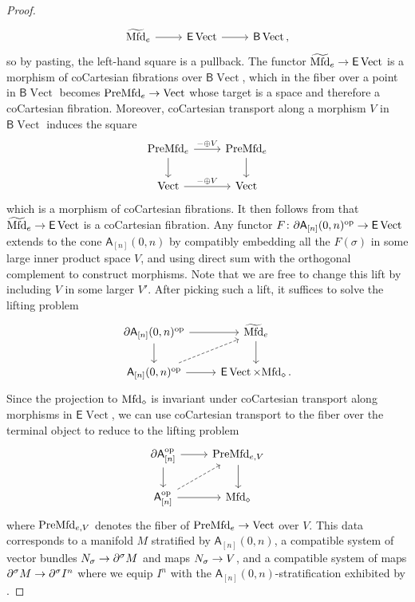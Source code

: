 \documentclass[10pt]{amsart}
\numberwithin{equation}{section}
\theoremstyle{definition}
\DeclareMathOperator{\op}{op}
\DeclareMathOperator{\Vect}{Vect}
\newcommand{\Mfd}{\mathrm{Mfd}\vphantom{d}}
\newcommand{\PreMfd}{\mathrm{PreMfd}\vphantom{d}}
\newcommand{\sfA}{\mathsf{A}}
\newcommand{\sfB}{\mathsf{B}}
\newcommand{\sfE}{\mathsf{E}}
\newcommand{\del}{\partial}
\renewcommand{\to}{\mathchoice{\longrightarrow}{\rightarrow}{}{}}
\begin{document}
\begin{proof}
\begin{equation*}
\begin{tikzcd}
			\widetilde{\Mfd}_{e}  \arrow[r]               &   \sfE\Vect  \arrow[r]            &  \sfB \Vect \, ,
		\end{tikzcd}
	\end{equation*}
	so by pasting, the left-hand square is a pullback.
  The functor $\widetilde{\Mfd}_{e}\to \sfE \Vect$ is a morphism of coCartesian fibrations over $\sfB \Vect$, which in the fiber over a point in $\sfB\Vect$ becomes $\PreMfd_{e}\to \Vect$ whose target is a space and therefore a coCartesian fibration.
  Moreover, coCartesian transport along a morphism $V$ in $\sfB\Vect$ induces the square
	\begin{equation*}
		\begin{tikzcd}
			\PreMfd_{e} \arrow[r, "-\oplus V"] \arrow[d]      &   \PreMfd_{e}  \arrow[d] \\
			\Vect  \arrow[r, "-\oplus V"]               &   \Vect
		\end{tikzcd}
	\end{equation*}
	which is a morphism of coCartesian fibrations.
  It then follows from  that $\widetilde{\Mfd}_{e}\to \sfE\Vect$ is a coCartesian fibration.
  Any functor $F\colon \del \sfA_{[n]}(0,n)^{\op} \to \sfE \Vect$ extends to the cone $\sfA_{[n]}(0,n)$ by compatibly embedding all the $F(\sigma)$ in some large inner product space $V$, and using direct sum with the orthogonal complement to construct morphisms.
  Note that we are free to change this lift by including $V$ in some larger $V'$.
  After picking such a lift, it suffices to solve the lifting problem
	\begin{equation*}
		\begin{tikzcd}
			\del \sfA_{[n]}(0,n)^{\op} \arrow[r] \arrow[d]      &   \widetilde{\Mfd}_{e} \arrow[d] \\
			\sfA_{[n]}(0,n)^{\op}  \arrow[r]  \arrow[ur,dashed]              &   \sfE \Vect \times \Mfd_{\diamond} \,.
		\end{tikzcd}
	\end{equation*}
	Since the projection to $\Mfd_{\diamond}$ is invariant under coCartesian transport along morphisms in $\sfE \Vect$, we can use coCartesian transport to the fiber over the terminal object to reduce to the lifting problem
	\begin{equation*}
		\begin{tikzcd}
			\del \sfA_{[n]}^{\op} \arrow[r] \arrow[d]      &   \PreMfd_{e,V}  \arrow[d] \\
			\sfA_{[n]}^{\op}  \arrow[r] \arrow[ur,dashed]              &   \Mfd_{\diamond}
		\end{tikzcd}
	\end{equation*}
	where $\PreMfd_{e,V}$ denotes the fiber of $\PreMfd_{e}\to \Vect$ over $V$.
  This data corresponds to a manifold $M$ stratified by $\sfA_{[n]}(0,n)$, a compatible system of vector bundles $N_{\sigma} \to \del^{\sigma}M$ and maps $N_{\sigma} \to V$, and a compatible system of maps $\del^{\sigma}M\to \del^{\sigma}I^{n}$ where we equip $I^{n}$ with the $\sfA_{[n]}(0,n)$-stratification exhibited by .


\end{proof}
\end{document}
